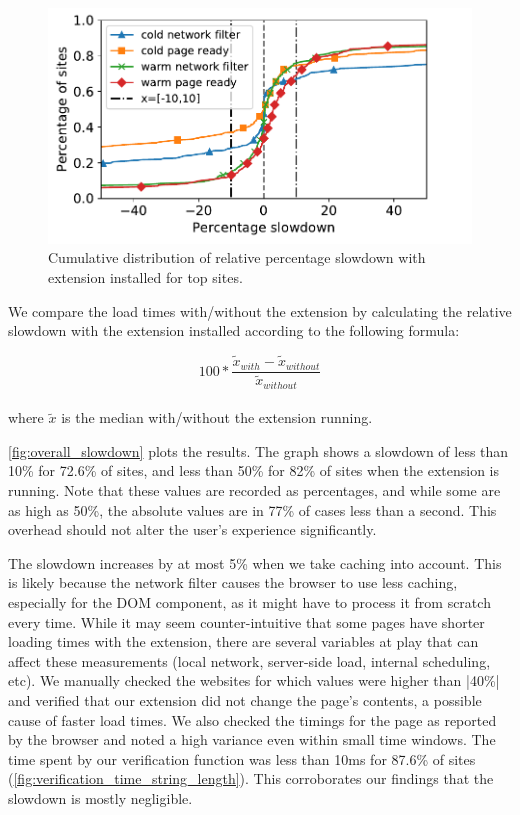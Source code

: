 \begin{figure}[h]
		\begin{center}
	\includegraphics[scale=0.5]{results/extension_slowdown_overall_small.pdf}
	\caption{Cumulative distribution of relative percentage slowdown with extension installed for top sites.}
	\label{fig:overall_slowdown}
\end{center}
	
\end{figure}

We compare the load times with/without the extension by calculating the relative slowdown with the extension installed according to the following formula:

\begin{equation*}
100*\frac{\tilde{x}_{with}-\tilde{x}_{without}}{\tilde{x}_{without}}
\end{equation*}
\\
where $\tilde{x}$ is the median with/without the extension running.

\autoref{fig:overall_slowdown} plots the results. The graph
shows a slowdown of less than 10\% for 72.6\% of sites, and less than
50\% for 82\% of sites when the extension is running. Note that these
values are recorded as percentages, and while some are as high as
50\%, the absolute values are in 77\% of cases less than a
second. This overhead should not alter the user's experience
significantly.

The slowdown increases by at most 5\% when we take caching into
account. This is likely because the network filter causes the browser
to use less caching, especially for the DOM component, as it might
have to process it from scratch every time. While it may seem
counter-intuitive that some pages have shorter loading times with
the extension, there are several variables at play that can affect
these measurements (local network, server-side load, internal
scheduling, etc). We manually checked the websites for which values
were higher than |40\%| and verified that our extension did not change
the page's contents, a possible cause of faster load times. We also
checked the timings for the page as reported by the browser and noted
a high variance even within small time windows. The time spent by our
verification function was less than 10ms for 87.6\% of sites
(\autoref{fig:verification_time_string_length}). This corroborates our
findings that the slowdown is mostly negligible.
